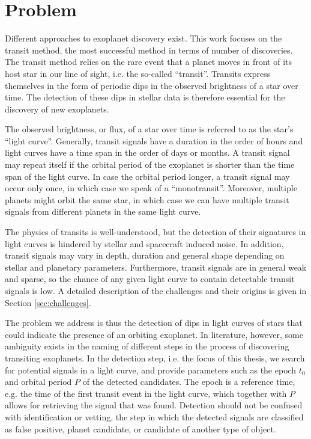 
\section{Problem}

Different approaches to exoplanet discovery exist. This work focuses on the transit method, the most successful method in terms of number of discoveries. The transit method relies on the rare event that a planet moves in front of its host star in our line of sight, i.e. the so-called ``transit''. Transits express themselves in the form of periodic dips in the observed brightness of a star over time. The detection of these dips in stellar data is therefore essential for the discovery of new exoplanets. 

The observed brightness, or flux, of a star over time is referred to as the star's ``light curve''. Generally, transit signals have a duration in the order of hours and light curves have a time span in the order of days or months. A transit signal may repeat itself if the orbital period of the exoplanet is shorter than the time span of the light curve. In case the orbital period longer, a transit signal may occur only once, in which case we speak of a ``monotransit''. Moreover, multiple planets might orbit the same star, in which case we can have multiple transit signals from different planets in the same light curve.

The physics of transits is well-understood, but the detection of their signatures in light curves is hindered by stellar and spacecraft induced noise. In addition, transit signals may vary in depth, duration and general shape depending on stellar and planetary parameters. Furthermore, transit signals are in general weak and sparse, so the chance of any given light curve to contain detectable transit signals is low. A detailed description of the challenges and their origins is given in Section \ref{sec:challenges}.

The problem we address is thus the detection of dips in light curves of stars that could indicate the presence of an orbiting exoplanet. In literature, however, some ambiguity exists in the naming of different steps in the process of discovering transiting exoplanets. In the detection step, i.e. the focus of this thesis, we search for potential signals in a light curve, and provide parameters such as the epoch $t_0$ and orbital period $P$ of the detected candidates. The epoch is a reference time, e.g. the time of the first transit event in the light curve, which together with $P$ allows for retrieving the signal that was found. Detection should not be confused with identification or vetting, the step in which the detected signals are classified as false positive, planet candidate, or candidate of another type of object.
